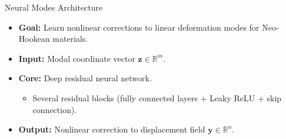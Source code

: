 \documentclass{beamer}
\begin{document}
\begin{frame}{Neural Modes Architecture}
    \begin{itemize}
        \item \textbf{Goal:} Learn nonlinear corrections to linear deformation modes for Neo-Hookean materials.
        \item \textbf{Input:} Modal coordinate vector \( \bm{z} \in \mathbb{R}^m \).
        \item \textbf{Core:} Deep residual neural network.
        \begin{itemize}
            \item Several residual blocks (fully connected layers + Leaky ReLU + skip connection).
        \end{itemize}
        \item \textbf{Output:} Nonlinear correction to displacement field \( \bm{y} \in \mathbb{R}^n \).
    \end{itemize}
    \begin{center}
        
\end{center}

\end{frame}
\end{document}
